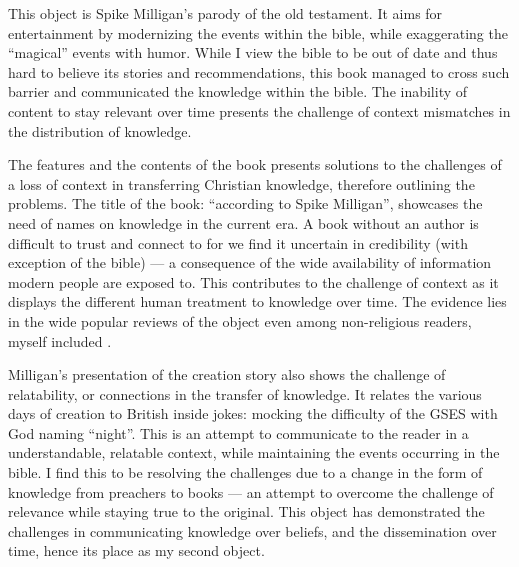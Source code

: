 \documentclass[a4paper,11pt]{article}
\begin{document}
This object is Spike Milligan's parody of the old testament. It aims for entertainment by modernizing the events within the bible, while exaggerating the ``magical'' events with humor. While I view the bible to be out of date and thus hard to believe its stories and recommendations, this book managed to cross such barrier and communicated the knowledge within the bible. The inability of content to stay relevant over time presents the challenge of context mismatches in the distribution of knowledge.


The features and the contents of the book presents solutions to the challenges of a loss of context in transferring Christian knowledge, therefore outlining the problems. The title of the book: ``according to Spike Milligan'', showcases the need of names on knowledge in the current era. A book without an author is difficult to trust and connect to for we find it uncertain in credibility (with exception of the bible) --- a consequence of the wide availability of information modern people are exposed to. This contributes to the challenge of context as it displays the different human treatment to knowledge over time. The evidence lies in the wide popular reviews of the object even among non-religious readers, myself included \parencite{Review}.

Milligan's presentation of the creation story also shows the challenge of relatability, or connections in the transfer of knowledge. It relates the various days of creation to British inside jokes: mocking the difficulty of the GSES with God naming ``night''. This is an attempt to communicate to the reader in a understandable, relatable context, while maintaining the events occurring in the bible. I find this to be resolving the challenges due to a change in the form of knowledge from preachers to books --- an attempt to overcome the challenge of relevance while staying true to the original. This object has demonstrated the challenges in communicating knowledge over beliefs, and the dissemination over time, hence its place as my second object.
\end{document}
